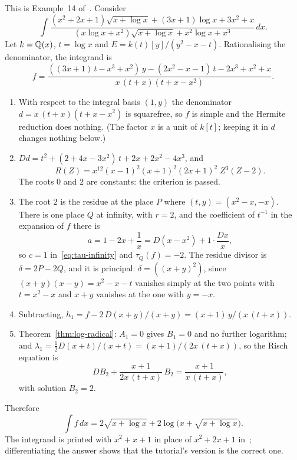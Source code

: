 \begin{example}\label{ex:elem-log}
This is Example~14 of~\cite{bronstein1998tutorial}. Consider
\[
  \int \frac{(x^2 + 2x + 1)\sqrt{x + \log x} + (3x + 1)\log x + 3x^2 + x}
            {(x \log x + x^2)\sqrt{x + \log x} + x^2 \log x + x^3}\, dx .
\]
Let $k = \mathbb{Q}(x)$, $t = \log x$ and $E = k(t)[y]/(y^2 - x - t)$. Rationalising
the denominator, the integrand is
\[
  f = \frac{((3x + 1)\,t - x^3 + x^2)\,y - (2x^2 - x - 1)\,t - 2x^3 + x^2 + x}
           {x\,(t + x)(t + x - x^2)} .
\]
\begin{enumerate}
\item With respect to the integral basis $(1, y)$ the denominator $d = x\,(t +
  x)(t + x - x^2)$ is squarefree, so $f$ is simple and the Hermite reduction
  does nothing. (The factor $x$ is a unit of $k[t]$; keeping it in $d$
  changes nothing below.)
\item $Dd = t^2 + (2 + 4x - 3x^2)\,t + 2x + 2x^2 - 4x^3$, and
  \[
    R(Z) = x^{12} (x - 1)^2 (x + 1)^2 (2x + 1)^2\; Z^3 (Z - 2) .
  \]
  The roots $0$ and $2$ are constants: the criterion is passed.
\item The root $2$ is the residue at the place $P$ where $(t, y) = (x^2 - x,
  -x)$. There is one place $Q$ at infinity, with $r = 2$, and the coefficient
  of $t^{-1}$ in the expansion of $f$ there is
  \[
    a = 1 - 2x + \frac1x = D(x - x^2) + 1 \cdot \frac{Dx}{x} ,
  \]
  so $c = 1$ in~\eqref{eq:tau-infinity} and $\tau_Q(f) = -2$. The residue
  divisor is $\delta = 2P - 2Q$, and it is principal: $\delta = ((x +
  y)^2)$, since $(x + y)(x - y) = x^2 - x - t$ vanishes simply at the two
  points with $t = x^2 - x$ and $x + y$ vanishes at the one with $y = -x$.
\item Subtracting, $h_1 = f - 2\, D(x + y)/(x + y) = (x + 1)\,y / (x\,(t +
  x))$.
\item Theorem~\ref{thm:log-radical}: $A_1 = 0$ gives $B_1 = 0$ and no further
  logarithm; and $\lambda_1 = \frac12 D(x + t)/(x + t) = (x + 1)/(2x\,(t +
  x))$, so the Risch equation is
  \[
    DB_2 + \frac{x + 1}{2x\,(t + x)}\, B_2 = \frac{x + 1}{x\,(t + x)} ,
  \]
  with solution $B_2 = 2$.
\end{enumerate}
Therefore
\[
  \int f\,dx = 2\sqrt{x + \log x} + 2 \log\bigl( x + \sqrt{x + \log x} \bigr) .
\]
The integrand is printed with $x^2 + x + 1$ in place of $x^2 + 2x + 1$
in~\cite[\S2]{bronstein1990}; differentiating the answer shows that the
tutorial's version is the correct one.
\end{example}

